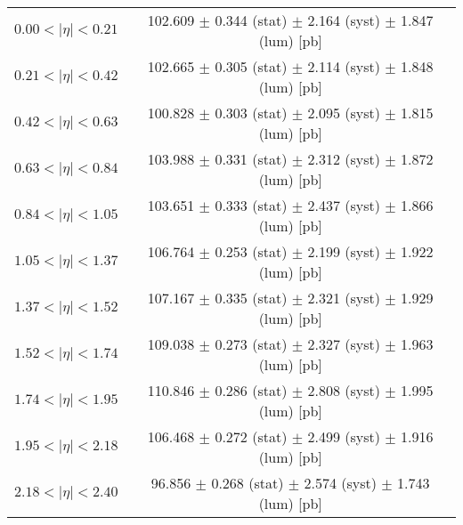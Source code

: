 \begin{tabular}{lc}
\hline
$0.00 < |\eta| <0.21$          & 102.609 $\pm$ 0.344 (stat) $\pm$ 2.164 (syst) $\pm$ 1.847 (lum) [pb]  \\
$0.21 < |\eta| <0.42$          & 102.665 $\pm$ 0.305 (stat) $\pm$ 2.114 (syst) $\pm$ 1.848 (lum) [pb]  \\
$0.42 < |\eta| <0.63$          & 100.828 $\pm$ 0.303 (stat) $\pm$ 2.095 (syst) $\pm$ 1.815 (lum) [pb]  \\
$0.63 < |\eta| <0.84$          & 103.988 $\pm$ 0.331 (stat) $\pm$ 2.312 (syst) $\pm$ 1.872 (lum) [pb]  \\
$0.84 < |\eta| <1.05$          & 103.651 $\pm$ 0.333 (stat) $\pm$ 2.437 (syst) $\pm$ 1.866 (lum) [pb]  \\
$1.05 < |\eta| <1.37$          & 106.764 $\pm$ 0.253 (stat) $\pm$ 2.199 (syst) $\pm$ 1.922 (lum) [pb]  \\
$1.37 < |\eta| <1.52$          & 107.167 $\pm$ 0.335 (stat) $\pm$ 2.321 (syst) $\pm$ 1.929 (lum) [pb]  \\
$1.52 < |\eta| <1.74$          & 109.038 $\pm$ 0.273 (stat) $\pm$ 2.327 (syst) $\pm$ 1.963 (lum) [pb]  \\
$1.74 < |\eta| <1.95$          & 110.846 $\pm$ 0.286 (stat) $\pm$ 2.808 (syst) $\pm$ 1.995 (lum) [pb]  \\
$1.95 < |\eta| <2.18$          & 106.468 $\pm$ 0.272 (stat) $\pm$ 2.499 (syst) $\pm$ 1.916 (lum) [pb]  \\
$2.18 < |\eta| <2.40$          & 96.856 $\pm$ 0.268 (stat) $\pm$ 2.574 (syst) $\pm$ 1.743 (lum) [pb]  \\
\hline
\end{tabular}
